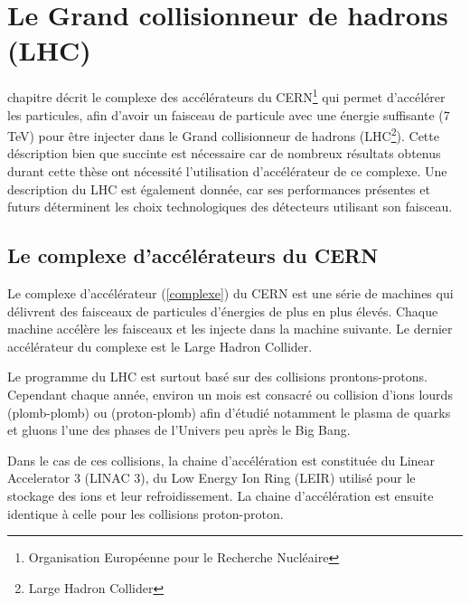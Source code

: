\chapter{Le Grand collisionneur de hadrons (LHC)}
\renewcommand\chapterillustration{LHC/lhc}
\ThisULCornerWallPaper{1}{\chapterillustration}
\minitoc
\vspace{1cm}
 chapitre décrit le complexe des accélérateurs du CERN\footnote{Organisation Européenne pour le Recherche Nucléaire} qui permet d'accélérer les particules, afin d'avoir un faisceau de particule avec une énergie suffisante (7 TeV) pour être injecter dans le Grand collisionneur de hadrons (LHC\footnote{Large Hadron Collider}). Cette déscription bien que succinte est nécessaire car de nombreux résultats obtenus durant cette thèse ont nécessité l'utilisation d'accélérateur de ce complexe. Une description du LHC est également donnée, car ses performances présentes et futurs déterminent les choix technologiques des détecteurs utilisant son faisceau.

\section{Le complexe d'accélérateurs du CERN}

Le complexe d'accélérateur (\ref{complexe}) du CERN est une série de machines qui délivrent des faisceaux de particules d'énergies de plus en plus élevés. Chaque machine accélère les faisceaux et les injecte dans la machine suivante. Le dernier accélérateur du complexe est le Large Hadron Collider.

Le programme du LHC est surtout basé sur des collisions prontons-protons. Cependant chaque année, environ un mois est consacré ou collision d'ions lourds (plomb-plomb) ou (proton-plomb) afin d'étudié notamment le plasma de quarks et gluons l'une des phases de l'Univers peu après le Big Bang. 

Dans le cas de ces collisions, la chaine d'accélération est constituée du Linear Accelerator 3 (LINAC 3), du Low Energy Ion Ring (LEIR) utilisé pour le stockage des ions et leur refroidissement. La chaine d'accélération est ensuite identique à celle pour les collisions proton-proton.


